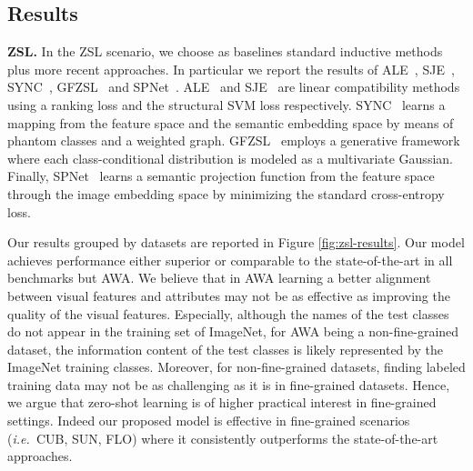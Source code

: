 \documentclass[runningheads]{llncs}
\newcommand{\ie}{\emph{i.e.~}}
\newcommand{\myparagraph}[1]{\noindent\textbf{#1}}
\begin{document}
\subsection{Results}

\myparagraph{ZSL.} 
In the ZSL scenario, we choose as baselines standard inductive methods plus more recent approaches. In particular we report the results of ALE~\cite{akata2013label}, SJE~\cite{akata2015evaluation}, SYNC~\cite{changpinyo2016synthesized}, GFZSL~\cite{verma2017simple} and SPNet~\cite{xian2019semantic}. ALE~\cite{akata2013label} and SJE~\cite{akata2015evaluation} are linear compatibility methods using a ranking loss and the structural SVM loss respectively. SYNC~\cite{changpinyo2016synthesized} learns a mapping from the feature space and the semantic embedding space by means of phantom classes and a weighted graph. GFZSL~\cite{verma2017simple} employs a generative framework where each class-conditional distribution is modeled as a multivariate Gaussian. Finally, SPNet~\cite{xian2019semantic} learns a semantic projection function from the feature space through the image embedding space by minimizing the standard cross-entropy loss. 

Our results grouped by datasets are reported in Figure \ref{fig:zsl-results}. 
Our model achieves performance either superior or comparable to the state-of-the-art in all benchmarks but AWA. We believe that in AWA learning a better alignment between visual features and attributes may not be as effective as improving the quality of the visual features. Especially, although the names of the test classes do not appear in the training set of ImageNet, for AWA being a non-fine-grained dataset, the information content of the test classes is likely represented by the ImageNet training classes. Moreover, for non-fine-grained datasets, finding labeled training data may not be as challenging as it is in fine-grained datasets. Hence, we argue that zero-shot learning is of higher practical interest in fine-grained settings. Indeed our proposed model is effective in fine-grained scenarios (\ie CUB, SUN, FLO) where it consistently outperforms the state-of-the-art approaches.
\end{document}
